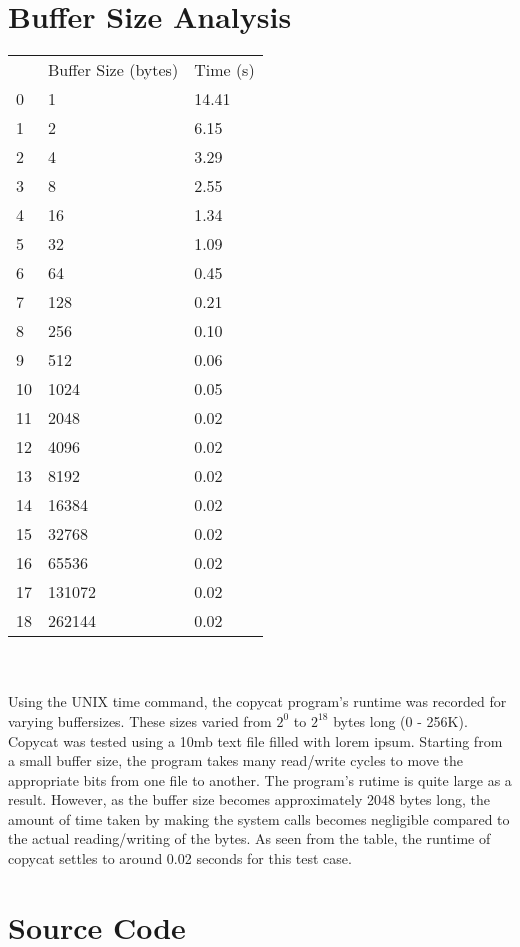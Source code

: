 \documentclass[12pt]{article}
\begin{document}
\section{Buffer Size Analysis}

\begin{tabular}{l l l}
 & Buffer Size (bytes) & Time (s) \\
0 & 1 & 14.41 \\
1 & 2 & 6.15 \\
2 & 4 & 3.29 \\
3 & 8 & 2.55 \\
4 & 16 & 1.34 \\
5 & 32 & 1.09 \\
6 & 64 & 0.45 \\
7 & 128 & 0.21 \\
8 & 256 & 0.10 \\
9 & 512 & 0.06 \\
10 & 1024 & 0.05 \\
11 & 2048 & 0.02 \\
12 & 4096 & 0.02 \\
13 & 8192 & 0.02 \\
14 & 16384 & 0.02 \\
15 & 32768 & 0.02 \\
16 & 65536 & 0.02 \\
17 & 131072 & 0.02 \\
18 & 262144 & 0.02 \\
\end{tabular}
\\
\\
Using the UNIX time command, the copycat program's runtime was recorded for varying buffersizes.
These sizes varied from $2^0$ to $2^18$ bytes long (0 - 256K).
Copycat was tested using a 10mb text file filled with lorem ipsum.
Starting from a small buffer size, the program takes many read/write cycles to move the appropriate bits from one file to another.
The program's rutime is quite large as a result.
However, as the buffer size becomes approximately 2048 bytes long, the amount of time taken by making the system calls becomes negligible compared to the actual reading/writing of the bytes.
As seen from the table, the runtime of copycat settles to around 0.02 seconds for this test case.


\section{Source Code}
\end{document}
